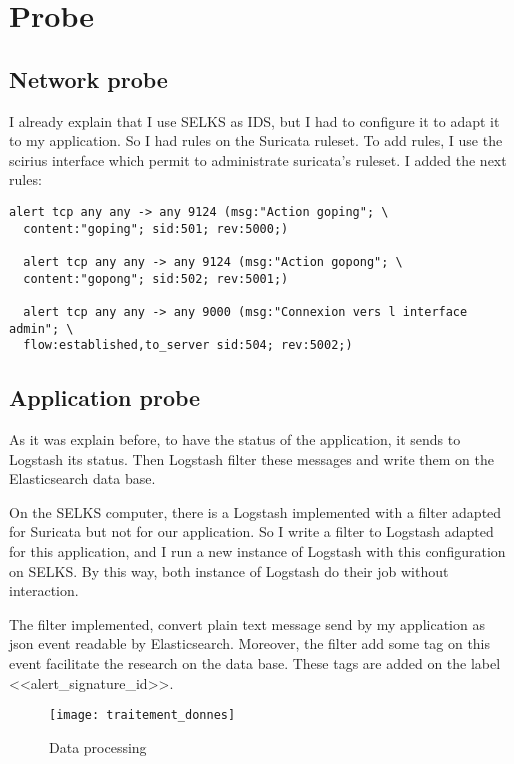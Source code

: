\section{Probe}

\subsection{Network probe}

I already explain that I use SELKS as IDS, but I had to configure it to adapt it to my application. So I had rules
on the Suricata ruleset. To add rules, I use the scirius interface which permit to administrate suricata's ruleset.
I added the next rules:

\begin{lstlisting}[language=suricata]
  alert tcp any any -> any 9124 (msg:"Action goping"; \
  content:"goping"; sid:501; rev:5000;)

  alert tcp any any -> any 9124 (msg:"Action gopong"; \
  content:"gopong"; sid:502; rev:5001;)

  alert tcp any any -> any 9000 (msg:"Connexion vers l interface admin"; \
  flow:established,to_server sid:504; rev:5002;)
\end{lstlisting}




\subsection{Application probe}

As it was explain before, to have the status of the application, it sends to Logstash its status. Then Logstash
filter these messages and write them on the Elasticsearch data base.

On the SELKS computer, there is a Logstash implemented with a filter adapted for Suricata but not for our
application. So I write a filter to Logstash adapted for this application, and I run a new instance of Logstash
with this configuration on SELKS. By this way, both instance of Logstash do their job without interaction.

The filter implemented, convert plain text message send by my application as json event readable by Elasticsearch.
Moreover, the filter add some tag on this event facilitate the research on the data base. These tags are added on the
label <<alert\_signature\_id>>.

\begin{figure}[h]
  \centering
  \texttt{[image: traitement\_donnes]}
  \caption{Data processing}
  \label{fig:dataprocessing}
\end{figure}


